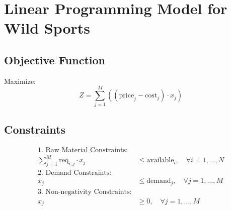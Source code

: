\documentclass{article}
\begin{document}
\section*{Linear Programming Model for Wild Sports}

\subsection*{Objective Function}
Maximize:
\[
Z = \sum_{j=1}^{M} ((\text{price}_j - \text{cost}_j) \cdot x_j)
\]

\subsection*{Constraints}
\begin{align*}
\text{1. Raw Material Constraints:} & \\
\sum_{j=1}^{M} \text{req}_{i,j} \cdot x_j & \leq \text{available}_i, \quad \forall i = 1, \ldots, N \\

\text{2. Demand Constraints:} & \\
x_j & \leq \text{demand}_j, \quad \forall j = 1, \ldots, M \\

\text{3. Non-negativity Constraints:} & \\
x_j & \geq 0, \quad \forall j = 1, \ldots, M
\end{align*}
\end{document}
